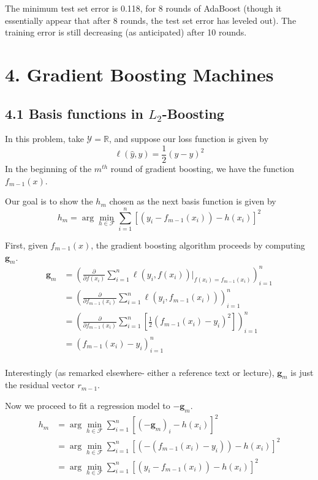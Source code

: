 \documentclass[paper=a4, fontsize=11pt]{scrartcl} %
\numberwithin{equation}{section} %
\numberwithin{figure}{section} %
\numberwithin{table}{section} %
\begin{document}
The minimum test set error is 0.118, for 8 rounds of AdaBoost (though it essentially appear that after 8 rounds, the test set error has leveled out). The training error is still decreasing (as anticipated) after 10 rounds.


\section*{4. Gradient Boosting Machines}
\subsection*{4.1 Basis functions in $L_2$-Boosting}

In this problem, take $\mathcal{Y} = \mathbb{R}$, and suppose our loss function is given by
\[\ell(\hat{y},y) = \frac{1}{2}(\hat{y} - y)^2\]
In the beginning of the $m^{th}$ round of gradient boosting, we have the function $f_{m-1}(x)$.

Our goal is to show the $h_m$ chosen as the next basis function is given by
\[h_m = \arg \min_{h \in \mathcal{F}} \sum_{i = 1}^n [(y_i - f_{m-1}(x_i)) - h(x_i)]^2\]

First, given $f_{m-1}(x)$, the gradient boosting algorithm proceeds by computing $\mathbf{g}_m$.
\begin{align*}
\mathbf{g}_m &= \left( \frac{\partial}{\partial f(x_i)} \sum_{i = 1}^n \ell(y_i, f(x_i)) \Bigg|_{f(x_i) = f_{m - 1}(x_i)} \right)_{i = 1}^n \\
	&= \left( \frac{\partial}{\partial f_{m-1}(x_i)} \sum_{i = 1}^n \ell(y_i, f_{m-1}(x_i)) \right)_{i = 1}^n \\
	&= \left( \frac{\partial}{\partial f_{m-1}(x_i)} \sum_{i = 1}^n \left[\frac{1}{2}(f_{m-1}(x_i) - y_i)^2\right] \right)_{i = 1}^n \\
	&= \left(f_{m-1}(x_i) - y_i\right)_{i = 1}^n \\
\end{align*}

Interestingly (as remarked elsewhere- either a reference text or lecture), $\mathbf{g}_m$ is just the residual vector $r_{m-1}$.

Now we proceed to fit a regression model to $-\mathbf{g}_m$.
\begin{align*}
h_m &= \arg \min_{h \in \mathcal{F}} \sum_{i = 1}^n [(-\mathbf{g}_m)_i - h(x_i)]^2 \\
	&= \arg \min_{h \in \mathcal{F}} \sum_{i = 1}^n [\left(-(f_{m-1}(x_i) - y_i)\right) - h(x_i)]^2 \\
	&= \arg \min_{h \in \mathcal{F}} \sum_{i = 1}^n [(y_i - f_{m-1}(x_i)) - h(x_i)]^2
\end{align*}
\end{document}
